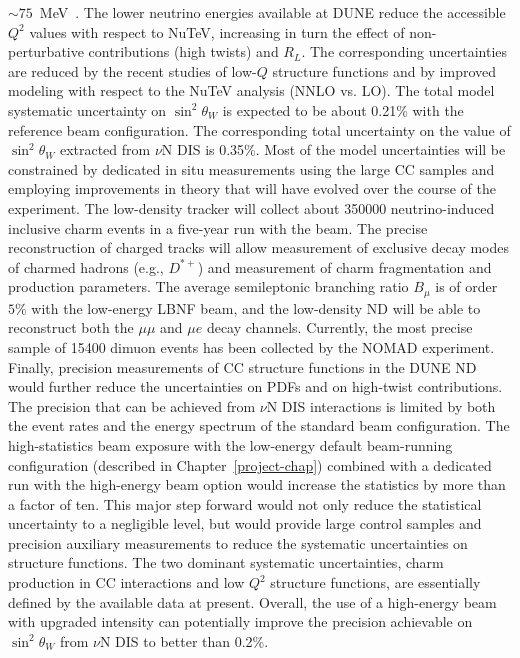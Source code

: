 $\sim75$~MeV~\cite{Samoylov:2013xoa}. The
lower neutrino energies available at DUNE reduce the accessible $Q^2$
values with respect to NuTeV, increasing in turn the effect of
non-perturbative contributions (high twists) and $R_L$. The
corresponding uncertainties are reduced by the recent studies of
low-$Q$ structure functions and by improved modeling with respect to
the NuTeV analysis (NNLO vs. LO).  The total model systematic
uncertainty on $\sin^2 \theta_W$ is expected to be about 0.21\% with
the reference beam configuration. The corresponding total uncertainty
on the value of $\sin^2 \theta_W$ extracted from $\nu$N DIS is 0.35\%.
Most of the model uncertainties will be constrained by dedicated in
situ measurements using the large CC samples and employing
improvements in theory that will have evolved over the course of the
experiment. The low-density tracker will collect about \num{350000}
neutrino-induced inclusive charm events in a five-year run with the
  beam.  The precise
reconstruction of charged tracks will allow measurement of exclusive
decay modes of charmed hadrons (e.g., $D^{*+}$) and measurement of
charm fragmentation and production parameters. The average
semileptonic branching ratio $B_\mu$ is of order $5\%$ with the
low-energy LBNF beam, and the low-density ND will be able to
reconstruct both the $\mu \mu$ and $\mu e$ decay channels. Currently,
the most precise sample of \num{15400} dimuon events has been
collected by the NOMAD experiment.  Finally, precision measurements of
CC structure functions in the DUNE ND would further reduce the
uncertainties on PDFs and on high-twist contributions.
The precision that can be achieved from $\nu$N DIS interactions is
limited by both the event rates and the energy spectrum of the
standard beam configuration.  The high-statistics beam
exposure with the low-energy default beam-running configuration
(described in Chapter~\ref{project-chap}) combined with a dedicated
run with the high-energy beam option would increase the statistics by
more than a factor of ten. This major step forward would not only
reduce the statistical uncertainty to a negligible level, but would
provide large control samples and precision auxiliary measurements to
reduce the systematic uncertainties on structure functions. The two
dominant systematic uncertainties, charm production in CC interactions
and low $Q^2$ structure functions, are essentially defined by the
available data at present.  Overall, the use of a high-energy beam
with upgraded intensity can potentially improve the precision
achievable on $\sin^2 \theta_W$ from $\nu$N DIS to better than 0.2\%.  

